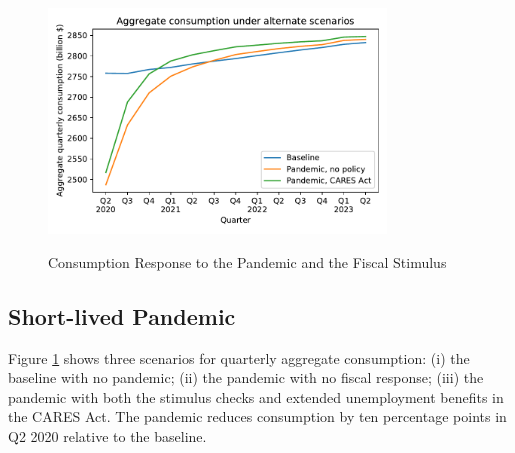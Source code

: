 \documentclass[titlepage]{\econtex}
\begin{document}
\begin{figure}
  \centering
  \caption{Consumption Response to the Pandemic and the Fiscal Stimulus}
  \label{cons_response}
  { \includegraphics[width=0.8\textwidth]{./Figures/AggConResp_examples}}
\end{figure}

\subsection{Short-lived Pandemic}

Figure \ref{cons_response} shows three scenarios for quarterly aggregate consumption: (i) the baseline with no pandemic; (ii) the pandemic with no fiscal response; (iii) the pandemic with both the stimulus checks and extended unemployment benefits in the CARES Act.
The pandemic reduces consumption by ten percentage points in Q2 2020 relative to the baseline.
\end{document}
